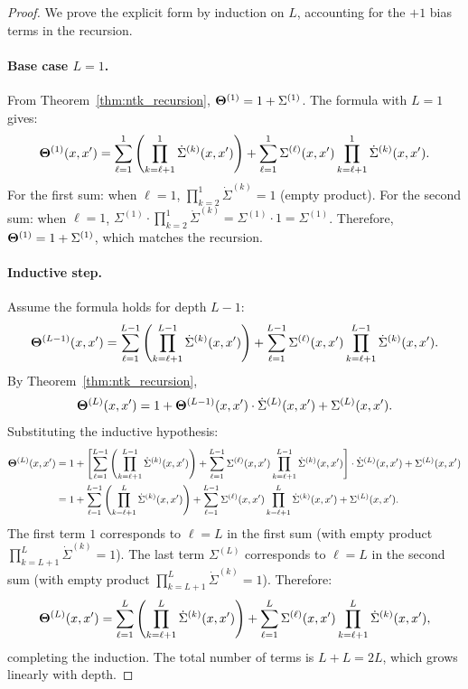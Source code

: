 \begin{proof}
\label{proof:general_L_ntk}
We prove the explicit form by induction on \( L \), accounting for the \( +1 \) bias terms in the recursion.

\paragraph{Base case \( L=1 \).}
From Theorem~\ref{thm:ntk_recursion}, \( \boldsymbol{\Theta}^{(1)} = 1 + \Sigma^{(1)} \). The formula with \( L=1 \) gives:
\begin{align}
\boldsymbol{\Theta}^{(1)}(x,x') = \sum_{\ell=1}^{1} \left(\prod_{k=\ell+1}^{1} \dot{\Sigma}^{(k)}(x,x')\right) + \sum_{\ell=1}^{1} \Sigma^{(\ell)}(x,x') \prod_{k=\ell+1}^{1} \dot{\Sigma}^{(k)}(x,x').
\end{align}
For the first sum: when \( \ell=1 \), \( \prod_{k=2}^{1} \dot{\Sigma}^{(k)} = 1 \) (empty product). For the second sum: when \( \ell=1 \), \( \Sigma^{(1)}\cdot\prod_{k=2}^{1} \dot{\Sigma}^{(k)} = \Sigma^{(1)}\cdot 1 = \Sigma^{(1)} \). Therefore, \( \boldsymbol{\Theta}^{(1)} = 1 + \Sigma^{(1)} \), which matches the recursion.

\paragraph{Inductive step.}
Assume the formula holds for depth \( L-1 \):
\begin{align}
\boldsymbol{\Theta}^{(L-1)}(x,x') = \sum_{\ell=1}^{L-1} \left(\prod_{k=\ell+1}^{L-1} \dot{\Sigma}^{(k)}(x,x')\right) + \sum_{\ell=1}^{L-1} \Sigma^{(\ell)}(x,x') \prod_{k=\ell+1}^{L-1} \dot{\Sigma}^{(k)}(x,x').
\end{align}
By Theorem~\ref{thm:ntk_recursion},
\begin{align}
\boldsymbol{\Theta}^{(L)}(x,x') = 1 + \boldsymbol{\Theta}^{(L-1)}(x,x')\cdot\dot{\Sigma}^{(L)}(x,x') + \Sigma^{(L)}(x,x').
\end{align}
Substituting the inductive hypothesis:
\begin{align*}
\boldsymbol{\Theta}^{(L)}(x,x') &= 1 + \left[\sum_{\ell=1}^{L-1} \left(\prod_{k=\ell+1}^{L-1} \dot{\Sigma}^{(k)}(x,x')\right) + \sum_{\ell=1}^{L-1} \Sigma^{(\ell)}(x,x') \prod_{k=\ell+1}^{L-1} \dot{\Sigma}^{(k)}(x,x')\right] \cdot \dot{\Sigma}^{(L)}(x,x') + \Sigma^{(L)}(x,x')\\
&= 1 + \sum_{\ell=1}^{L-1} \left(\prod_{k=\ell+1}^{L} \dot{\Sigma}^{(k)}(x,x')\right) + \sum_{\ell=1}^{L-1} \Sigma^{(\ell)}(x,x') \prod_{k=\ell+1}^{L} \dot{\Sigma}^{(k)}(x,x') + \Sigma^{(L)}(x,x').
\end{align*}
The first term \( 1 \) corresponds to \( \ell=L \) in the first sum (with empty product \( \prod_{k=L+1}^{L} \dot{\Sigma}^{(k)} = 1 \)). The last term \( \Sigma^{(L)} \) corresponds to \( \ell=L \) in the second sum (with empty product \( \prod_{k=L+1}^{L} \dot{\Sigma}^{(k)} = 1 \)). Therefore:
\begin{align}
\boldsymbol{\Theta}^{(L)}(x,x') = \sum_{\ell=1}^{L} \left(\prod_{k=\ell+1}^{L} \dot{\Sigma}^{(k)}(x,x')\right) + \sum_{\ell=1}^{L} \Sigma^{(\ell)}(x,x') \prod_{k=\ell+1}^{L} \dot{\Sigma}^{(k)}(x,x'),
\end{align}
completing the induction. The total number of terms is \( L + L = 2L \), which grows linearly with depth.
\end{proof}
